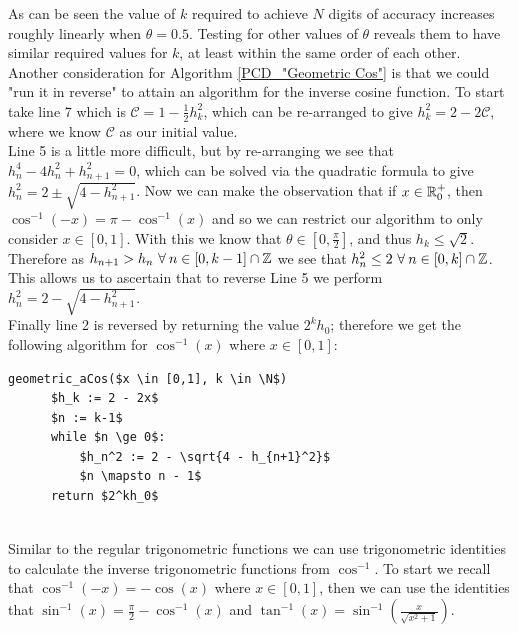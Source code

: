 {As can be seen the value of \(k\) required to achieve \(N\) digits of accuracy increases roughly linearly when \(\theta = 0.5\). Testing for other values of \(\theta\) reveals them to have similar required values for \(k\), at least within the same order of each other.\\

Another consideration for Algorithm \ref{PCD_"Geometric Cos"} is that we could "run it in reverse" to attain an algorithm for the inverse cosine function. To start take line 7 which is \(\mathcal{C} = 1 - \frac{1}{2}h_k^2\), which can be re-arranged to give \(h_k^2 = 2 - 2\mathcal{C}\), where we know \(\mathcal{C}\) as our initial value.\\

Line 5 is a little more difficult, but by re-arranging we see that \(h_n^4 - 4h_n^2 + h_{n+1}^2 = 0\), which can be solved via the quadratic formula to give \(h_n^2 = 2 \pm \sqrt{4 - h_{n+1}^2}\). Now we can make the observation that if \(x \in \mathbb{R}^+_0\), then \(\cos^{-1}(-x) = \pi - \cos^{-1}(x)\) and so we can restrict our algorithm to only consider \(x \in [0,1]\). With this we know that \(\theta \in [0,\frac{\pi}{2}]\), and thus \(h_k \le \sqrt{2}\). Therefore as \(h_{n+1} > h_n\ \forall\: n \in [0,k-1]\cap\mathbb{Z}\) we see that \(h_n^2 \le 2\ \forall\: n \in [0,k]\cap\mathbb{Z}\). This allows us to ascertain that to reverse Line 5 we perform \(h_n^2 = 2 - \sqrt{4 - h_{n+1}^2}\).\\

Finally line 2 is reversed by returning the value \(2^kh_0\); therefore we get the following algorithm for \(\cos^{-1}(x)\) where \(x \in [0,1]\):

\begin{lstlisting}[caption={Geometric calculation of \(\cos^{-1}\)},label={PCD_"Geometric aCos"}]
  geometric_aCos($x \in [0,1], k \in \N$)
      $h_k := 2 - 2x$
      $n := k-1$
      while $n \ge 0$:
          $h_n^2 := 2 - \sqrt{4 - h_{n+1}^2}$
          $n \mapsto n - 1$
      return $2^kh_0$
\end{lstlisting}\\

Similar to the regular trigonometric functions we can use trigonometric identities to calculate the inverse trigonometric functions from \(\cos^{-1}\). To start we recall that \(\cos^{-1}(-x) = -\cos(x)\) where \(x \in [0,1]\), then we can use the identities that \(\sin^{-1}(x) = \frac{\pi}{2} - \cos^{-1}(x)\) and \(\tan^{-1}(x) = \sin^{-1}(\frac{x}{\sqrt{x^2 + 1}})\).\\

}
